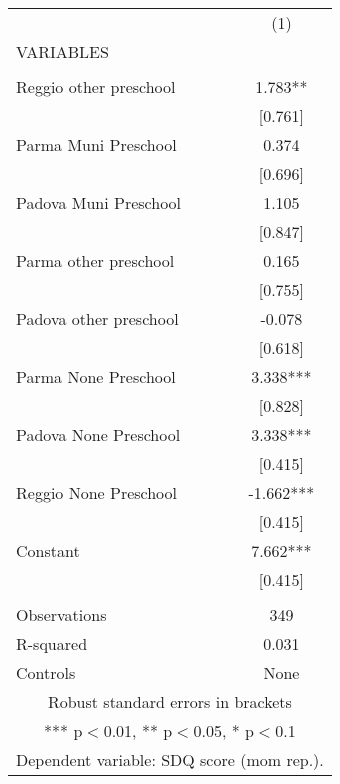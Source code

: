 \begin{tabular}{lc} \hline
 & (1) \\
VARIABLES &  \\ \hline
 &  \\
Reggio other preschool & 1.783** \\
 & [0.761] \\
Parma Muni Preschool & 0.374 \\
 & [0.696] \\
Padova Muni Preschool & 1.105 \\
 & [0.847] \\
Parma other preschool & 0.165 \\
 & [0.755] \\
Padova other preschool & -0.078 \\
 & [0.618] \\
Parma None Preschool & 3.338*** \\
 & [0.828] \\
Padova None Preschool & 3.338*** \\
 & [0.415] \\
Reggio None Preschool & -1.662*** \\
 & [0.415] \\
Constant & 7.662*** \\
 & [0.415] \\
 &  \\
Observations & 349 \\
R-squared & 0.031 \\
 Controls & None \\ \hline
\multicolumn{2}{c}{ Robust standard errors in brackets} \\
\multicolumn{2}{c}{ *** p$<$0.01, ** p$<$0.05, * p$<$0.1} \\
\multicolumn{2}{c}{ Dependent variable: SDQ score (mom rep.).} \\
\end{tabular}
